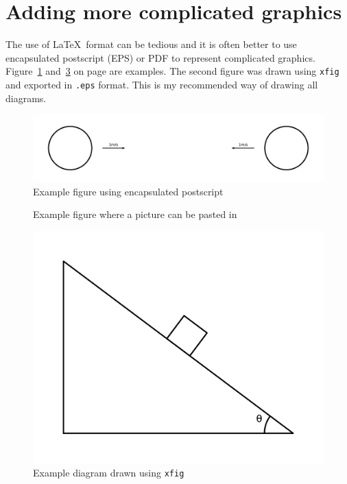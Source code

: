 \documentclass[12pt,a4paper,twoside,openright]{report}
\begin{document}
\section{Adding more complicated graphics}
The use of \LaTeX\ format can be tedious and it is often better to use
encapsulated postscript (EPS) or PDF to represent complicated graphics.
Figure~\ref{epsfig} and~\ref{xfig} on page \pageref{xfig} are
examples. The second figure was drawn using \texttt{xfig} and exported in
{\tt.eps} format. This is my recommended way of drawing all diagrams.
\begin{figure}[tbh]
\centerline{\includegraphics{figs/img1.png}}
\caption{Example figure using encapsulated postscript}
\label{epsfig}
\end{figure}
\begin{figure}[tbh]
\vspace{4in}
\caption{Example figure where a picture can be pasted in}
\label{pastedfig}
\end{figure}
\begin{figure}[tbh]
\centerline{\includegraphics{figs/img2.png}}
\caption{Example diagram drawn using \texttt{xfig}}
\label{xfig}
\end{figure}
\end{document}
